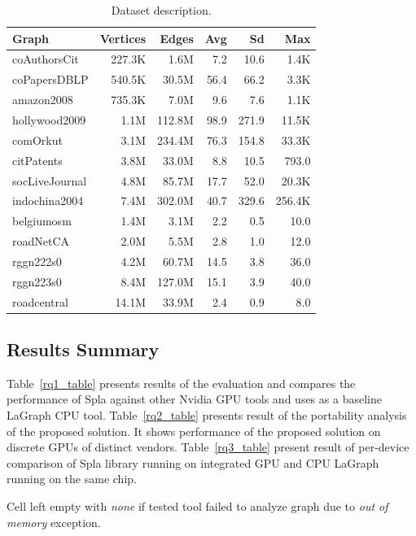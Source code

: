 \begin{table}[tbp]
\caption{Dataset description.} 
\begin{center}
    \begin{tabular}{|l|r|r|r|r|r|}
    \hline
    Graph&Vertices&Edges&Avg&Sd&Max\\
    \hline
    \hline
    coAuthorsCit&227.3K&1.6M&7.2&10.6&1.4K\\
    coPapersDBLP&540.5K&30.5M&56.4&66.2&3.3K\\
    amazon2008&735.3K&7.0M&9.6&7.6&1.1K\\
    hollywood2009&1.1M&112.8M&98.9&271.9&11.5K\\
    comOrkut&3.1M&234.4M&76.3&154.8&33.3K\\
    citPatents&3.8M&33.0M&8.8&10.5&793.0\\
    socLiveJournal&4.8M&85.7M&17.7&52.0&20.3K\\
    indochina2004&7.4M&302.0M&40.7&329.6&256.4K\\
    \hline
    belgiumosm&1.4M&3.1M&2.2&0.5&10.0\\
    roadNetCA&2.0M&5.5M&2.8&1.0&12.0\\
    rggn222s0&4.2M&60.7M&14.5&3.8&36.0\\
    rggn223s0&8.4M&127.0M&15.1&3.9&40.0\\
    roadcentral&14.1M&33.9M&2.4&0.9&8.0\\
    \hline
    \end{tabular}
    \label{dataset:info}
\end{center}
\end{table}

\subsection{Results Summary}

Table~\ref{rq1_table} presents results of the evaluation and compares the performance of Spla against other Nvidia GPU tools and uses as a baseline LaGraph CPU tool. 
Table~\ref{rq2_table} presents result of the portability analysis of the proposed solution. It shows performance of the proposed solution on discrete GPUs of distinct vendors.
Table~\ref{rq3_table} present result of per-device comparison of Spla library running on integrated GPU and CPU LaGraph running on the same chip.

Cell left empty with \textit{none} if tested tool failed to analyze graph due to \textit{out of memory} exception.\\

